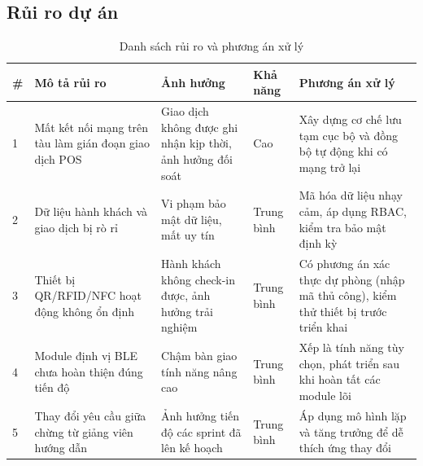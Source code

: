 \subsection{Rủi ro dự án}
\begin{table}[htbp]
    \centering
    \small
    \caption{Danh sách rủi ro và phương án xử lý}
    \begin{tabular}{|p{0.5cm}|p{3.4cm}|p{3cm}|p{1.3cm}|p{3.4cm}|}
        \hline
        \textbf{\#} & \textbf{Mô tả rủi ro} & \textbf{Ảnh hưởng} & \textbf{Khả năng} & \textbf{Phương án xử lý} \\
        \hline
        1 & Mất kết nối mạng trên tàu làm gián đoạn giao dịch POS & Giao dịch không được ghi nhận kịp thời, ảnh hưởng đối soát & Cao & Xây dựng cơ chế lưu tạm cục bộ và đồng bộ tự động khi có mạng trở lại \\
        \hline
        2 & Dữ liệu hành khách và giao dịch bị rò rỉ & Vi phạm bảo mật dữ liệu, mất uy tín & Trung bình & Mã hóa dữ liệu nhạy cảm, áp dụng RBAC, kiểm tra bảo mật định kỳ \\
        \hline
        3 & Thiết bị QR/RFID/NFC hoạt động không ổn định & Hành khách không check-in được, ảnh hưởng trải nghiệm & Trung bình & Có phương án xác thực dự phòng (nhập mã thủ công), kiểm thử thiết bị trước triển khai \\
        \hline
        4 & Module định vị BLE chưa hoàn thiện đúng tiến độ & Chậm bàn giao tính năng nâng cao & Trung bình & Xếp là tính năng tùy chọn, phát triển sau khi hoàn tất các module lõi \\
        \hline
        5 & Thay đổi yêu cầu giữa chừng từ giảng viên hướng dẫn & Ảnh hưởng tiến độ các sprint đã lên kế hoạch & Trung bình & Áp dụng mô hình lặp và tăng trưởng để dễ thích ứng thay đổi \\
        \hline
    \end{tabular}
\end{table}